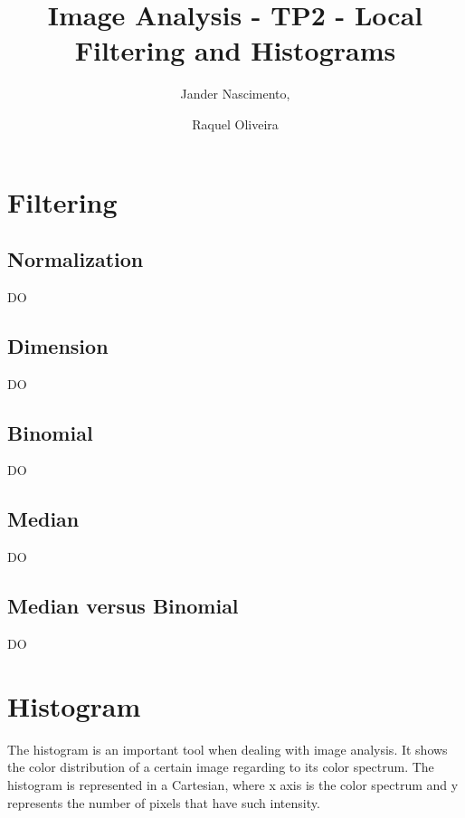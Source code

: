 \documentclass{report}
\begin{document}
\title{Image Analysis - TP2 - Local Filtering and Histograms}

\author{Jander Nascimento, 
\and Raquel Oliveira}

\maketitle

\tableofcontents

\section{Filtering}

	\subsection{Normalization}

		DO
	
	\subsection{Dimension}

		DO

	\subsection{Binomial}

		DO

	\subsection{Median}

		DO

	\subsection{Median versus Binomial}

		DO

\section{Histogram}

	The histogram is an important tool when dealing with image analysis. It shows the color distribution of a certain image regarding to its color spectrum. The 		histogram is represented in a Cartesian, where x axis is the color spectrum and y represents the number of pixels that have such intensity.
\end{document}
